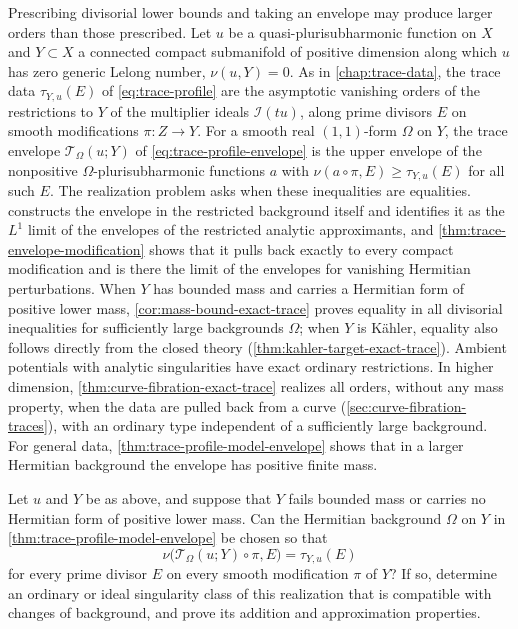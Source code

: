 Prescribing divisorial lower bounds and taking an envelope may produce larger orders than those prescribed. Let $u$ be a quasi-plurisubharmonic function on $X$ and $Y\subset X$ a connected compact submanifold of positive dimension along which $u$ has zero generic Lelong number, $\nu(u,Y)=0$. As in \cref{chap:trace-data}, the trace data $\tau_{Y,u}(E)$ of \eqref{eq:trace-profile} are the asymptotic vanishing orders of the restrictions to $Y$ of the multiplier ideals $\mathcal I(tu)$, along prime divisors $E$ on smooth modifications $\pi\colon Z\to Y$. For a smooth real $(1,1)$-form $\Omega$ on $Y$, the trace envelope $\mathcal T_\Omega(u;Y)$ of \eqref{eq:trace-profile-envelope} is the upper envelope of the nonpositive $\Omega$-plurisubharmonic functions $a$ with $\nu(a\circ\pi,E)\geq\tau_{Y,u}(E)$ for all such $E$. The realization problem asks when these inequalities are equalities.  constructs the envelope in the restricted background itself and identifies it as the $L^1$ limit of the envelopes of the restricted analytic approximants, and \cref{thm:trace-envelope-modification} shows that it pulls back exactly to every compact modification and is there the limit of the envelopes for vanishing Hermitian perturbations. When $Y$ has bounded mass and carries a Hermitian form of positive lower mass, \cref{cor:mass-bound-exact-trace} proves equality in all divisorial inequalities for sufficiently large backgrounds $\Omega$; when $Y$ is K\"ahler, equality also follows directly from the closed theory (\cref{thm:kahler-target-exact-trace}). Ambient potentials with analytic singularities have exact ordinary restrictions. In higher dimension, \cref{thm:curve-fibration-exact-trace} realizes all orders, without any mass property, when the data are pulled back from a curve (\cref{sec:curve-fibration-traces}), with an ordinary type independent of a sufficiently large background. For general data, \cref{thm:trace-profile-model-envelope} shows that in a larger Hermitian background the envelope has positive finite mass.

\begin{problem}\label{qu:exact-trace-program}
Let $u$ and $Y$ be as above, and suppose that $Y$ fails bounded mass or carries no Hermitian form of positive lower mass. Can the Hermitian background $\Omega$ on $Y$ in \cref{thm:trace-profile-model-envelope} be chosen so that
\[
 \nu\bigl(\mathcal T_\Omega(u;Y)\circ\pi,E\bigr)
       =\tau_{Y,u}(E)
\]
for every prime divisor $E$ on every smooth modification $\pi$ of $Y$? If so, determine an ordinary or ideal singularity class of this realization that is compatible with changes of background, and prove its addition and approximation properties.
\end{problem}

